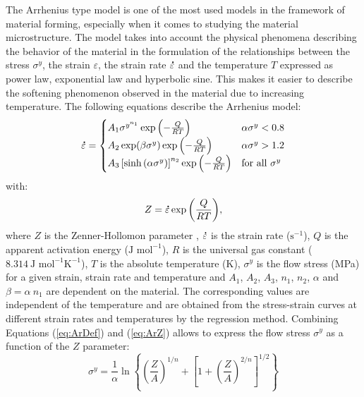 \documentclass[twoside,english,1p,final,sort&compress]{elsarticle}
\theoremstyle{plain}
\DeclareRobustCommand{\mdot}[1]{\accentset{\mbox{\bfseries .}}{#1}}
\DeclareRobustCommand{\ps}{\text{s}^{-1}}
\begin{document}
The Arrhenius type model \cite{Sellars-1966} is one of the most used models in the framework of material forming, especially when it comes to studying the material microstructure.
The model takes into account the physical phenomena describing the behavior of the material in the formulation of the relationships between the stress $\sigma^y$, the strain $\varepsilon$, the strain rate $\mdot\varepsilon$ and the temperature $T$ expressed as power law, exponential law and hyperbolic sine.
This makes it easier to describe the softening phenomenon observed in the material due to increasing temperature.
The following equations describe the Arrhenius model:
\begin{equation}
\mdot\varepsilon =
\begin{cases}
A_1 \sigma^{y^{n_1}} \exp{\left(-\frac{Q}{RT}\right)} & \alpha\sigma^y < 0.8\\
A_2 \exp(\beta\sigma^y) \exp{\left(-\frac{Q}{RT}\right)} & \alpha\sigma^y > 1.2\\
A_3 \left[\sinh{\left(\alpha\sigma^y\right)}\right]^{n_2} \exp{\left(-\frac{Q}{RT}\right)} & \text{for all }\sigma^y
\end{cases}
\label{eq:ArDef}
\end{equation}
with:
\begin{equation}
Z = \mdot\varepsilon \exp{\left(\frac{Q}{RT}\right)}, \label{eq:ArZ}
\end{equation}
where $Z$ is the Zenner-Hollomon parameter \cite{Zener-1944}, $\mdot\varepsilon$ is the strain rate ($\ps$), $Q$ is the apparent activation energy ($\text{J~mol}^{-1}$), $R$ is the universal gas constant ($8.314~\text{J~mol}^{-1} \text{K}^{-1}$), $T$ is the absolute temperature (K), $\sigma^y$ is the flow stress (MPa) for a given strain, strain rate and temperature and $A_1$, $A_2$, $A_3$, $n_1$, $n_2$, $\alpha$ and $\beta=\alpha~n_1$ are dependent on the material.
The corresponding values are independent of the temperature and are obtained from the stress-strain curves at different strain rates and temperatures by the regression method.
Combining Equations (\ref{eq:ArDef}) and (\ref{eq:ArZ}) allows to express the flow stress $\sigma^y$ as a function of the $Z$ parameter:
\begin{equation}
\sigma^y = \frac{1}{\alpha} \ln\left\{\left(\frac{Z}{A}\right)^{1/n} + \left[1 + \left(\frac{Z}{A}\right)^{2/n}\right]^{1/2}\right\}
\end{equation}
\end{document}
